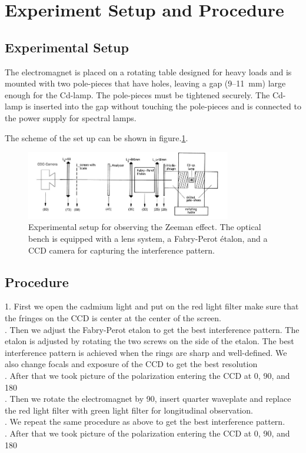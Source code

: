 \documentclass[a4paper,12pt]{article}
\begin{document}
\section{Experiment Setup and Procedure}
\subsection{Experimental Setup}
The electromagnet is placed on a rotating table designed for heavy loads and is mounted with two pole-pieces that have holes, leaving a gap (9--11~mm) large enough for the Cd-lamp. The pole-pieces must be tightened securely. The Cd-lamp is inserted into the gap without touching the pole-pieces and is connected to the power supply for spectral lamps.

The scheme of the set up can be shown in figure.\ref{fig:setup}.
\begin{figure}[H]
    \centering
    \includegraphics[width=0.8\textwidth]{setup.png}
    \caption{Experimental setup for observing the Zeeman effect. The optical bench is equipped with a lens system, a Fabry-Perot étalon, and a CCD camera for capturing the interference pattern.}
    \label{fig:setup}
\end{figure}
\subsection{Procedure}
    1. First we open the cadmium light and put on the red light filter make sure that the fringes on the CCD is center at the center of the screen. \\
. Then we adjust the Fabry-Perot etalon to get the best interference pattern. The etalon is adjusted by rotating the two screws on the side of the etalon. The best interference pattern is achieved when the rings are sharp and well-defined. We also change focals and exposure of the CCD to get the best resolution\\
. After that we took picture of the polarization entering the CCD at 0\textdegree, 90\textdegree, and 180\textdegree\\ 
. Then we rotate the electromagnet by 90\textdegree, insert quarter waveplate and replace the red light filter with green light filter for longitudinal observation.\\
. We repeat the same procedure as above to get the best interference pattern.\\
. After that we took picture of the polarization entering the CCD at 0\textdegree, 90\textdegree, and 180\textdegree\\
\end{document}
